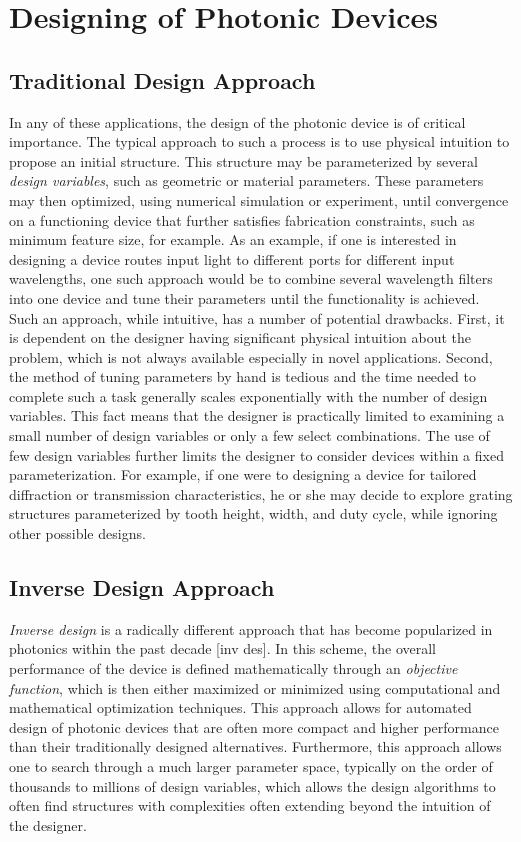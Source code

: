 \section{Designing of Photonic Devices}

\subsection{Traditional Design Approach}

In any of these applications, the design of the photonic device is of critical importance.
The typical approach to such a process is to use physical intuition to propose an initial structure.
This structure may be parameterized by several \textit{design variables}, such as geometric or material parameters.
These parameters may then optimized, using numerical simulation or experiment, until convergence on a functioning device that further satisfies fabrication constraints, such as minimum feature size, for example.
As an example, if one is interested in designing a device routes input light to different ports for different input wavelengths, one such approach would be to combine several wavelength filters into one device and tune their parameters until the functionality is achieved.
Such an approach, while intuitive, has a number of potential drawbacks.
First, it is dependent on the designer having significant physical intuition about the problem, which is not always available especially in novel applications.
Second, the method of tuning parameters by hand is tedious and the time needed to complete such a task generally scales exponentially with the number of design variables.
This fact means that the designer is practically limited to examining a small number of design variables or only a few select combinations.
The use of few design variables further limits the designer to consider devices within a fixed parameterization.
For example, if one were to designing a device for tailored diffraction or transmission characteristics, he or she may decide to explore grating structures parameterized by tooth height, width, and duty cycle, while ignoring other possible designs.

\subsection{Inverse Design Approach}

\textit{Inverse design} is a radically different approach that has become popularized in photonics within the past decade [inv des].  
In this scheme, the overall performance of the device is defined mathematically through an \textit{objective function}, which is then either maximized or minimized using computational and mathematical optimization techniques.
This approach allows for automated design of photonic devices that are often more compact and higher performance than their traditionally designed alternatives.
Furthermore, this approach allows one to search through a much larger parameter space, typically on the order of thousands to millions of design variables, which allows the design algorithms to often find structures with complexities often extending beyond the intuition of the designer.

